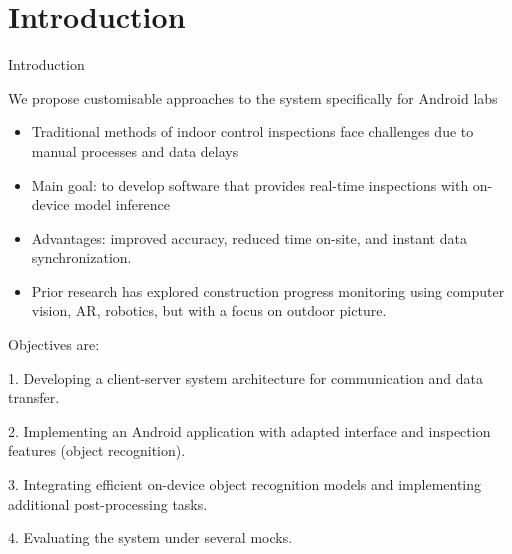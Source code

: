 \documentclass{beamer}%
\begin{document}
\section[Introduction]{Introduction}
\begin{frame}{Introduction}
\footnotesize

We propose customisable approaches to the system specifically for Android labs

\begin{itemize}

\item Traditional methods of indoor control inspections face challenges due to manual processes and data delays

\item { Main goal}: to develop software that provides real-time inspections with on-device model inference

\item Advantages: improved accuracy, reduced time on-site, and instant data synchronization.

\item Prior research has explored construction progress monitoring using computer vision, AR, robotics, but with a focus on outdoor picture.

\end{itemize}

Objectives are:

1. Developing a client-server system architecture for communication and data transfer.

2. Implementing an Android application with adapted interface and inspection features (object recognition).

3. Integrating efficient on-device object recognition models and implementing additional post-processing tasks.

4. Evaluating the system under several mocks.



\end{frame}
\end{document}
